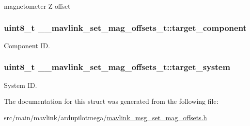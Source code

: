 magnetometer Z offset 

\hypertarget{struct____mavlink__set__mag__offsets__t_a1a7ce0b0f0c38669f8f5419f4a0b83e7}{
\subsubsection[{target\+\_\+component}]{\setlength{\rightskip}{0pt plus 5cm}uint8\+\_\+t \+\_\+\+\_\+mavlink\+\_\+set\+\_\+mag\+\_\+offsets\+\_\+t\+::target\+\_\+component}}\label{struct____mavlink__set__mag__offsets__t_a1a7ce0b0f0c38669f8f5419f4a0b83e7}


Component I\+D. 

\hypertarget{struct____mavlink__set__mag__offsets__t_ae337dc4aa082f9004dde4ac022e20251}{
\subsubsection[{target\+\_\+system}]{\setlength{\rightskip}{0pt plus 5cm}uint8\+\_\+t \+\_\+\+\_\+mavlink\+\_\+set\+\_\+mag\+\_\+offsets\+\_\+t\+::target\+\_\+system}}\label{struct____mavlink__set__mag__offsets__t_ae337dc4aa082f9004dde4ac022e20251}


System I\+D. 



The documentation for this struct was generated from the following file\+:\begin{DoxyCompactItemize}
\item 
src/main/mavlink/ardupilotmega/\hyperlink{mavlink__msg__set__mag__offsets_8h}{mavlink\+\_\+msg\+\_\+set\+\_\+mag\+\_\+offsets.\+h}\end{DoxyCompactItemize}
